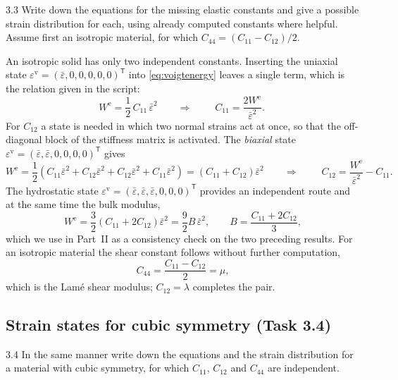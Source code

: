 \documentclass[11pt,a4paper]{article}
\numberwithin{equation}{section}
\theoremstyle{remark}
\newcommand{\We}{W^{\mathrm{e}}}
\newcommand{\epsb}{\bar{\varepsilon}}
\begin{document}
\begin{task}{3.3}
  Write down the equations for the missing elastic constants and give a possible strain distribution
  for each, using already computed constants where helpful. Assume first an isotropic material, for
  which $C_{44} = (C_{11}-C_{12})/2$.
\end{task}

An isotropic solid has only two independent constants. Inserting the uniaxial state
$\varepsilon^{\mathrm{v}} = (\epsb,0,0,0,0,0)^{\mathsf T}$ into \cref{eq:voigtenergy} leaves a single
term, which is the relation given in the script:
\begin{equation}\label{eq:C11}
  \We = \frac{1}{2}\,C_{11}\,\epsb^2
  \qquad\Longrightarrow\qquad
  \boxed{\;C_{11} = \frac{2\We}{\epsb^2}.\;}
\end{equation}
For $C_{12}$ a state is needed in which two normal strains act at once, so that the off-diagonal block
of the stiffness matrix is activated. The \emph{biaxial} state
$\varepsilon^{\mathrm{v}} = (\epsb,\epsb,0,0,0,0)^{\mathsf T}$ gives
\begin{equation}\label{eq:biax}
  \We = \frac{1}{2}\left(C_{11}\epsb^2 + C_{12}\epsb^2 + C_{12}\epsb^2 + C_{11}\epsb^2\right)
      = \left(C_{11}+C_{12}\right)\epsb^2
  \qquad\Longrightarrow\qquad
  \boxed{\;C_{12} = \frac{\We}{\epsb^2} - C_{11}.\;}
\end{equation}
The hydrostatic state $\varepsilon^{\mathrm{v}} = (\epsb,\epsb,\epsb,0,0,0)^{\mathsf T}$ provides an
independent route and at the same time the bulk modulus,
\begin{equation}\label{eq:hydro}
  \We = \frac{3}{2}\left(C_{11}+2C_{12}\right)\epsb^2 = \frac{9}{2}B\,\epsb^2,
  \qquad
  B = \frac{C_{11}+2C_{12}}{3},
\end{equation}
which we use in Part~II as a consistency check on the two preceding results. For an isotropic material
the shear constant follows without further computation,
\begin{equation}\label{eq:C44iso}
  C_{44} = \frac{C_{11}-C_{12}}{2} = \mu,
\end{equation}
which is the Lam\'e shear modulus; $C_{12} = \lambda$ completes the pair.

\subsection{Strain states for cubic symmetry (Task 3.4)}\label{sec:cubic}

\begin{task}{3.4}
  In the same manner write down the equations and the strain distribution for a material with cubic
  symmetry, for which $C_{11}$, $C_{12}$ and $C_{44}$ are independent.
\end{task}
\end{document}
